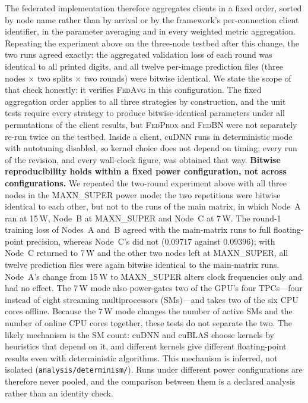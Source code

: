 \documentclass[journal]{IEEEtran}
\newcommand{\fedavg}{\textsc{FedAvg}}
\newcommand{\fedprox}{\textsc{FedProx}}
\newcommand{\fedbn}{\textsc{FedBN}}
\begin{document}
The federated implementation therefore aggregates clients in a fixed order, sorted by node name rather than by arrival or by the framework's per-connection client identifier, in the parameter averaging and in every weighted metric aggregation. Repeating the experiment above on the three-node testbed after this change, the two runs agreed exactly: the aggregated validation loss of each round was identical to all printed digits, and all twelve per-image prediction files (three nodes $\times$ two splits $\times$ two rounds) were bitwise identical. We state the scope of that check honestly: it verifies \fedavg{} in this configuration. The fixed aggregation order applies to all three strategies by construction, and the unit tests require every strategy to produce bitwise-identical parameters under all permutations of the client results, but \fedprox{} and \fedbn{} were not separately re-run twice on the testbed. Inside a client, cuDNN runs in deterministic mode with autotuning disabled, so kernel choice does not depend on timing; every run of the revision, and every wall-clock figure, was obtained that way. \textbf{Bitwise reproducibility holds within a fixed power configuration, not across configurations.} We repeated the two-round experiment above with all three nodes in the MAXN\_SUPER power mode: the two repetitions were bitwise identical to each other, but not to the runs of the main matrix, in which Node~A ran at 15\,W, Node~B at MAXN\_SUPER and Node~C at 7\,W. The round-1 training loss of Nodes~A and~B agreed with the main-matrix runs to full floating-point precision, whereas Node~C's did not ($0.09717$ against $0.09396$); with Node~C returned to 7\,W and the other two nodes left at MAXN\_SUPER, all twelve prediction files were again bitwise identical to the main-matrix runs. Node~A's change from 15\,W to MAXN\_SUPER alters clock frequencies only and had no effect. The 7\,W mode also power-gates two of the GPU's four TPCs---four instead of eight streaming multiprocessors (SMs)---and takes two of the six CPU cores offline. Because the 7\,W mode changes the number of active SMs and the number of online CPU cores together, these tests do not separate the two. The likely mechanism is the SM count: cuDNN and cuBLAS choose kernels by heuristics that depend on it, and different kernels give different floating-point results even with deterministic algorithms. This mechanism is inferred, not isolated (\texttt{analysis/determinism/}). Runs under different power configurations are therefore never pooled, and the comparison between them is a declared analysis rather than an identity check.
\end{document}
